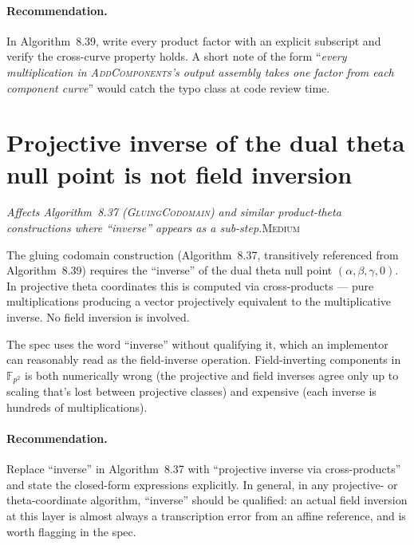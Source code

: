 \documentclass[a4paper,11pt]{article}
\newcommand{\algo}[1]{Algorithm~#1}
\newcommand{\medium}{\textsc{\color{RoyalBlue}Medium}}
\newcommand{\finding}[2]{\noindent\textit{#1}\hfill#2\par\smallskip}
\begin{document}
\paragraph{Recommendation.}
In \algo{8.39}, write every product factor with an explicit
subscript and verify the cross-curve property holds.  A short
note of the form ``\textit{every multiplication in
\textsc{AddComponents}'s output assembly takes one factor from
each component curve}'' would catch the typo class at code
review time.

\section{Projective inverse of the dual theta null point is not field
  inversion}
\label{sec:projective-inverse-gluing}

\finding{Affects \algo{8.37} (\textsc{GluingCodomain}) and
similar product-theta constructions where ``inverse'' appears
as a sub-step.}{\medium}

The gluing codomain construction (\algo{8.37}, transitively
referenced from \algo{8.39}) requires the ``inverse'' of the
dual theta null point $(\alpha, \beta, \gamma, 0)$.  In
projective theta coordinates this is computed via
cross-products --- pure multiplications producing a vector
projectively equivalent to the multiplicative inverse.  No
field inversion is involved.

The spec uses the word ``inverse'' without qualifying it, which
an implementor can reasonably read as the field-inverse
operation.  Field-inverting components in $\mathbb{F}_{p^2}$
is both numerically wrong (the projective and field inverses
agree only up to scaling that's lost between projective
classes) and expensive (each inverse is hundreds of
multiplications).

\paragraph{Recommendation.}
Replace ``inverse'' in \algo{8.37} with ``projective inverse
via cross-products'' and state the closed-form expressions
explicitly.  In general, in any projective- or theta-coordinate
algorithm, ``inverse'' should be qualified: an actual field
inversion at this layer is almost always a transcription error
from an affine reference, and is worth flagging in the spec.

\end{document}

